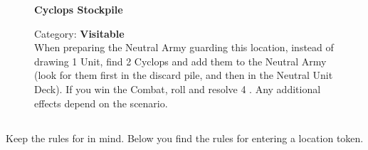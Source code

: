 \begin{figure}[H]
  \begin{minipage}[t]{0.47\textwidth}
    \vspace{0pt}
    \centering
    \textbf{Cyclops Stockpile}\par
    \caption{\small Category: \textbf{Visitable}\\
      When preparing the Neutral Army guarding this location, instead of drawing 1  Unit, find 2  Cyclops and add them to the Neutral Army (look for them first in the  discard pile, and then in the  Neutral Unit Deck).
      If you win the Combat, roll and resolve 4 .
      Any additional effects depend on the scenario.
    }
  \end{minipage}\hfill
\end{figure}
%


\newpage

\subsection*{}

Keep the rules for  in mind. Below you find the rules for entering a location token.

